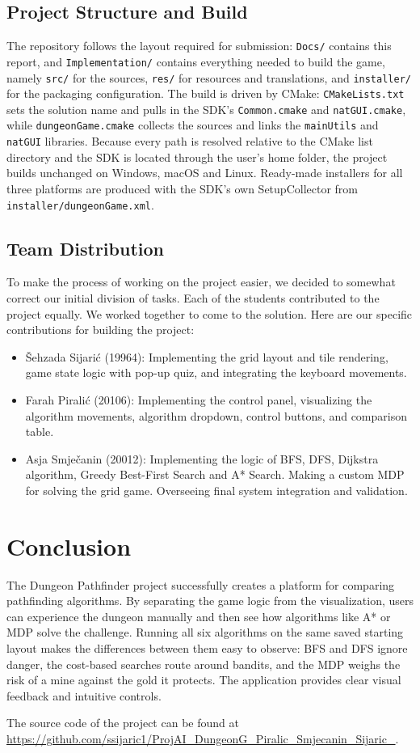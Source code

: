 \documentclass[12pt, a4paper]{article}
\newcommand{\code}[1]{\texttt{#1}}
\begin{document}
\subsection{Project Structure and Build}
The repository follows the layout required for submission: \code{Docs/} contains this report, and \code{Implementation/} contains everything needed to build the game, namely \code{src/} for the sources, \code{res/} for resources and translations, and \code{installer/} for the packaging configuration. The build is driven by CMake: \code{CMakeLists.txt} sets the solution name and pulls in the SDK's \code{Common.cmake} and \code{natGUI.cmake}, while \code{dungeonGame.cmake} collects the sources and links the \code{mainUtils} and \code{natGUI} libraries. Because every path is resolved relative to the CMake list directory and the SDK is located through the user's home folder, the project builds unchanged on Windows, macOS and Linux. Ready-made installers for all three platforms are produced with the SDK's own SetupCollector from \code{installer/dungeonGame.xml}.

\subsection{Team Distribution}
To make the process of working on the project easier, we decided to somewhat correct our initial division of tasks.
Each of the students contributed to the project equally. We worked together to come to the solution. Here are our specific contributions for building the project:
\begin{itemize}
    \item Šehzada Sijarić (19964): Implementing the grid layout and tile rendering, game state logic with pop-up quiz, and integrating the keyboard movements.
    \item Farah Piralić (20106): Implementing the control panel, visualizing the algorithm movements, algorithm dropdown, control buttons, and comparison table.
    \item Asja Smječanin (20012): Implementing the logic of BFS, DFS, Dijkstra algorithm, Greedy Best-First Search and A* Search. Making a custom MDP for solving the grid game. Overseeing final system integration and validation.
\end{itemize}

\section{Conclusion}
The Dungeon Pathfinder project successfully creates a platform for comparing pathfinding algorithms. By separating the game logic from the visualization, users can experience the dungeon manually and then see how algorithms like A* or MDP solve the challenge. Running all six algorithms on the same saved starting layout makes the differences between them easy to observe: BFS and DFS ignore danger, the cost-based searches route around bandits, and the MDP weighs the risk of a mine against the gold it protects. The application provides clear visual feedback and intuitive controls.

The source code of the project can be found at \url{https://github.com/ssijaric1/ProjAI_DungeonG_Piralic_Smjecanin_Sijaric_}.
\end{document}
